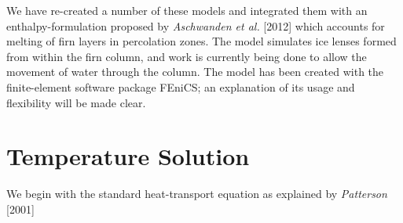 \documentclass{article}%
\begin{document}
We have re-created a number of these models and integrated them with an enthalpy-formulation proposed by \emph{Aschwanden et al.} [2012] which accounts for melting of firn layers in percolation zones.  The model simulates ice lenses formed from within the firn column, and work is currently being done to allow the movement of water through the column.  The model has been created with the finite-element software package FEniCS; an explanation of its usage and flexibility will be made clear.

\section{Temperature Solution}

We begin with the standard heat-transport equation as explained by \emph{Patterson} [2001]
\end{document}
